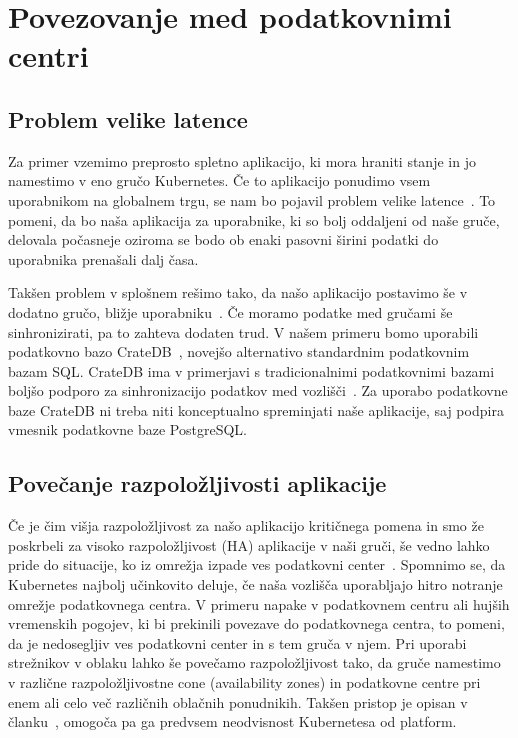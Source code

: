 \documentclass[a4paper, 12pt]{book}
\begin{document}
\chapter{Povezovanje med podatkovnimi centri}
\label{povezovanje-med-centri}
\section{Problem velike latence}
Za primer vzemimo preprosto spletno aplikacijo, ki mora hraniti stanje in jo namestimo v eno gručo Kubernetes.
Če to aplikacijo ponudimo vsem uporabnikom na globalnem trgu, se nam bo pojavil problem velike latence~\cite{minimizing-latency}.
To pomeni, da bo naša aplikacija za uporabnike, ki so bolj oddaljeni od naše gruče, delovala počasneje oziroma se bodo ob enaki pasovni širini podatki do uporabnika prenašali dalj časa.

Takšen problem v splošnem rešimo tako, da našo aplikacijo postavimo še v dodatno gručo, bližje uporabniku~\cite{geo-instability}.
Če moramo podatke med gručami še sinhronizirati, pa to zahteva dodaten trud.
V našem primeru bomo uporabili podatkovno bazo CrateDB~\cite{cratedb}, novejšo alternativo standardnim podatkovnim bazam SQL.
CrateDB ima v primerjavi s tradicionalnimi podatkovnimi bazami boljšo podporo za sinhronizacijo podatkov med vozlišči~\cite{databases-comparison}.
Za uporabo podatkovne baze CrateDB ni treba niti konceptualno spreminjati naše aplikacije, saj podpira vmesnik podatkovne baze PostgreSQL.
\section{Povečanje razpoložljivosti aplikacije}
Če je čim višja razpoložljivost za našo aplikacijo kritičnega pomena in smo že poskrbeli za visoko razpoložljivost (HA) aplikacije v naši gruči, še vedno lahko pride do situacije, ko iz omrežja izpade ves podatkovni center~\cite{cloud-failures}.
Spomnimo se, da Kubernetes najbolj učinkovito deluje, če naša vozlišča uporabljajo hitro notranje omrežje podatkovnega centra.
V primeru napake v podatkovnem centru ali hujših vremenskih pogojev, ki bi prekinili povezave do podatkovnega centra, to pomeni, da je nedosegljiv ves podatkovni center in s tem gruča v njem.
Pri uporabi strežnikov v oblaku lahko še povečamo razpoložljivost tako, da gruče namestimo v različne razpoložljivostne cone (availability zones) in podatkovne centre pri enem ali celo več različnih oblačnih ponudnikih.
Takšen pristop je opisan v članku~\cite{tosca-fed}, omogoča pa ga predvsem neodvisnost Kubernetesa od platform.
\end{document}
